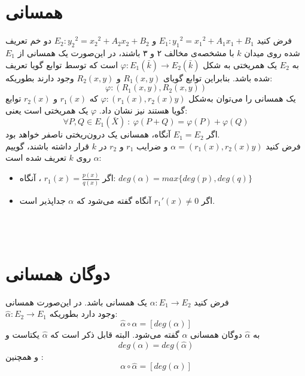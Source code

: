 \section{همسانی }
فرض کنید 
$E_1 : {y_1}^2 = {x_1}^2+A_1x_1+B_1$
و
$E_2 : {y_2}^2 = {x_2}^2+A_2x_2+B_2$
دو خم تعریف شده روی میدان
$k$
با مشخصه‌ی مخالف ۲ و ۳ باشند، در این‌صورت یک همسانی از
$E_1$
به
$E_2$
یک همریختی به شکل
$\varphi : E_1(\bar{k}) \longrightarrow E_2(\bar{k})$
است که توسط توابع گویا تعریف شده باشد. بنابراین توابع گویای 
$R_1(x,y)$
و
$R_2(x,y)$
وجود دارند بطوریکه:
$$ \varphi : (R_1(x,y), R_2(x,y)) $$
یک همسانی را می‌توان به‌شکل 
$\varphi : (r_1(x),r_2(x)y)$
که
$r_1(x)$
و
$r_2(x)$
توابع گویا هستند نیز نشان داد.
\remark
$\varphi$
یک همریختی است یعنی:
$$ \forall P,Q \in E_1(\bar{X}) ~:~ \varphi(P+Q)=\varphi(P)+ \varphi(Q) $$
\remark
اگر
$E_1=E_2$
آنگاه، همسانی یک درون‌ریختی ناصفر خواهد بود.
\\
فرض کنید 
$\alpha = (r_1(x), r_2(x)y)$
و ضرایب 
$r_1$
و
$r_2$
در
$k$
قرار داشته باشند، گوییم 
$\alpha$
روی
$k$
تعریف شده است:
\begin{itemize}
\item{
اگر 
$r_1(x) = \frac{p(x)}{q(x)}$
، آنگاه:
$ deg(\alpha) = max \{ deg(p), deg(q) \} $
}

\item{
اگر 
${r_1}'(x) \ne 0$
آنگاه گفته می‌شود که
$\alpha$
جداپذیر است.
}
\end{itemize}~
\\
\\
\section{دوگان همسانی}
\theorem 
فرض کنید 
$\alpha : E_1 \longrightarrow E_2$
یک همسانی باشد. در این‌صورت همسانی
\\
$\hat{\alpha} : E_2 \longrightarrow E_1$
وجود دارد بطوریکه:
$$ \hat{\alpha} \circ  \alpha = [deg(\alpha)] $$
به 
$\hat{\alpha}$
دوگان همسانی
$\alpha$
گفته می‌شود. البته قابل ذکر است که
$\hat{\alpha}$
یکتاست و 
$$deg(\alpha) = deg(\hat{\alpha})$$
و همچنین :
$$ \alpha \circ \hat{\alpha} = [deg(\alpha)]$$
\\
